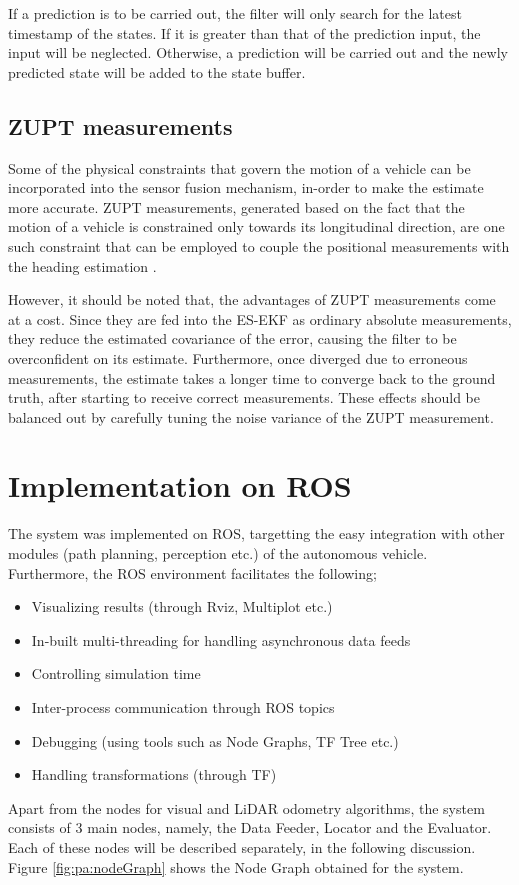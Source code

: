 If a prediction is to be carried out, the filter will only search for the latest timestamp of the states. If it is greater than that of the prediction input, the input will be neglected. Otherwise, a prediction will be carried out and the newly predicted state will be added to the state buffer.



\subsection{\acrlong{ZUPT} measurements}
Some of the physical constraints that govern the motion of a vehicle can be incorporated into the sensor fusion mechanism, in-order to make the estimate more accurate. \gls{ZUPT} measurements, generated based on the fact that the motion of a vehicle is constrained only towards its longitudinal direction, are one such constraint that can be employed to couple the positional measurements with the heading estimation \cite{pa:Dissanayake2001ZUPT}. 

However, it should be noted that, the advantages of \gls{ZUPT} measurements come at a cost. Since they are fed into the \gls{ES-EKF} as ordinary absolute measurements, they reduce the estimated covariance of the error, causing the filter to be overconfident on its estimate. Furthermore, once diverged due to erroneous measurements, the estimate takes a longer time to converge back to the ground truth, after starting to receive correct measurements. These effects should be balanced out by carefully tuning the noise variance of the \gls{ZUPT} measurement.





\section{Implementation on \acrlong{ROS}}
The system was implemented on \gls{ROS}, targetting the easy integration with other modules (path planning, perception etc.) of the autonomous vehicle. Furthermore, the \gls{ROS} environment facilitates the following;
\begin{itemize}
	\item Visualizing results (through Rviz, Multiplot etc.)
	\item In-built multi-threading for handling asynchronous data feeds
	\item Controlling simulation time
	\item Inter-process communication through \gls{ROS} topics
	\item Debugging (using tools such as Node Graphs, TF Tree etc.)
	\item Handling transformations (through TF)
\end{itemize}
Apart from the nodes for visual and \gls{LiDAR} odometry algorithms, the system consists of 3 main nodes, namely, the Data Feeder, Locator and the Evaluator. Each of these nodes will be described separately, in the following discussion. Figure \ref{fig:pa:nodeGraph} shows the Node Graph obtained for the system.

